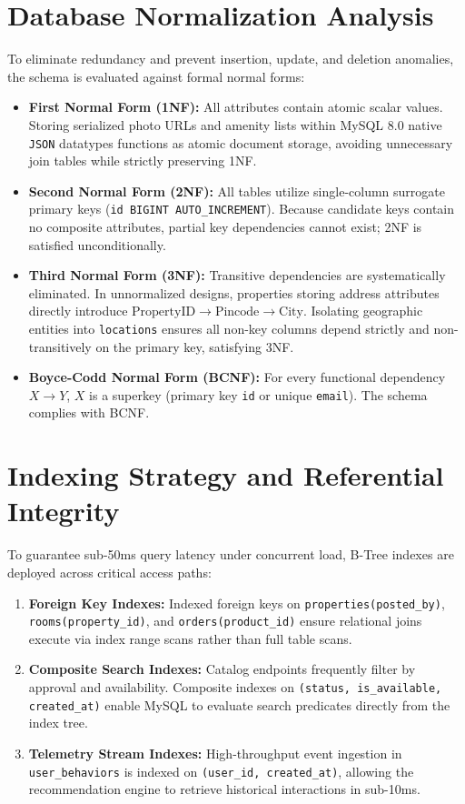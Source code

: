 \section{Database Normalization Analysis}
To eliminate redundancy and prevent insertion, update, and deletion anomalies, the schema is evaluated against formal normal forms:
\begin{itemize}
    \item \textbf{First Normal Form (1NF):} All attributes contain atomic scalar values. Storing serialized photo URLs and amenity lists within MySQL 8.0 native \texttt{JSON} datatypes functions as atomic document storage, avoiding unnecessary join tables while strictly preserving 1NF.
    \item \textbf{Second Normal Form (2NF):} All tables utilize single-column surrogate primary keys (\texttt{id BIGINT AUTO\_INCREMENT}). Because candidate keys contain no composite attributes, partial key dependencies cannot exist; 2NF is satisfied unconditionally.
    \item \textbf{Third Normal Form (3NF):} Transitive dependencies are systematically eliminated. In unnormalized designs, properties storing address attributes directly introduce $\text{PropertyID} \rightarrow \text{Pincode} \rightarrow \text{City}$. Isolating geographic entities into \texttt{locations} ensures all non-key columns depend strictly and non-transitively on the primary key, satisfying 3NF.
    \item \textbf{Boyce-Codd Normal Form (BCNF):} For every functional dependency $X \rightarrow Y$, $X$ is a superkey (primary key \texttt{id} or unique \texttt{email}). The schema complies with BCNF.
\end{itemize}

\section{Indexing Strategy and Referential Integrity}
To guarantee sub-50ms query latency under concurrent load, B-Tree indexes are deployed across critical access paths:
\begin{enumerate}
    \item \textbf{Foreign Key Indexes:} Indexed foreign keys on \texttt{properties(posted\_by)}, \texttt{rooms(property\_id)}, and \texttt{orders(product\_id)} ensure relational joins execute via index range scans rather than full table scans.
    \item \textbf{Composite Search Indexes:} Catalog endpoints frequently filter by approval and availability. Composite indexes on \texttt{(status, is\_available, created\_at)} enable MySQL to evaluate search predicates directly from the index tree.
    \item \textbf{Telemetry Stream Indexes:} High-throughput event ingestion in \texttt{user\_behaviors} is indexed on \texttt{(user\_id, created\_at)}, allowing the recommendation engine to retrieve historical interactions in sub-10ms.
\end{enumerate}

